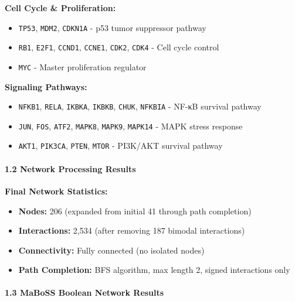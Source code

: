 \textbf{Cell Cycle \& Proliferation:}

\begin{itemize}
\tightlist
\item
  \texttt{TP53}, \texttt{MDM2}, \texttt{CDKN1A} - p53 tumor suppressor
  pathway
\item
  \texttt{RB1}, \texttt{E2F1}, \texttt{CCND1}, \texttt{CCNE1},
  \texttt{CDK2}, \texttt{CDK4} - Cell cycle control
\item
  \texttt{MYC} - Master proliferation regulator
\end{itemize}

\textbf{Signaling Pathways:}

\begin{itemize}
\tightlist
\item
  \texttt{NFKB1}, \texttt{RELA}, \texttt{IKBKA}, \texttt{IKBKB},
  \texttt{CHUK}, \texttt{NFKBIA} - NF-κB survival pathway
\item
  \texttt{JUN}, \texttt{FOS}, \texttt{ATF2}, \texttt{MAPK8},
  \texttt{MAPK9}, \texttt{MAPK14} - MAPK stress response
\item
  \texttt{AKT1}, \texttt{PIK3CA}, \texttt{PTEN}, \texttt{MTOR} -
  PI3K/AKT survival pathway
\end{itemize}

\hypertarget{network-processing-results}{%
\paragraph{1.2 Network Processing
Results}\label{network-processing-results}}

\textbf{Final Network Statistics:}

\begin{itemize}
\tightlist
\item
  \textbf{Nodes:} 206 (expanded from initial 41 through path completion)
\item
  \textbf{Interactions:} 2,534 (after removing 187 bimodal interactions)
\item
  \textbf{Connectivity:} Fully connected (no isolated nodes)
\item
  \textbf{Path Completion:} BFS algorithm, max length 2, signed
  interactions only
\end{itemize}

\hypertarget{maboss-boolean-network-results}{%
\paragraph{1.3 MaBoSS Boolean Network
Results}\label{maboss-boolean-network-results}}

